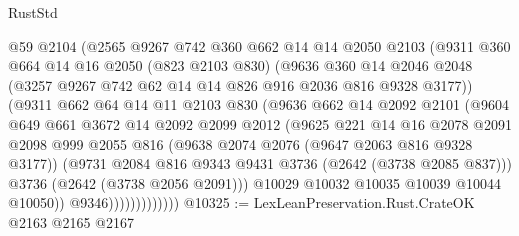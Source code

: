 \begin{lexlean}{RustStd}
\begin{coremodule}
                        @59
                        @2104
                        (@2565
                          @9267
                          @742
                          @360
                          @662
                          @14
                          @14
                          @2050
                          @2103
                          (@9311
                            @360
                            @664
                            @14
                            @16
                            @2050
                            (@823 @2103 @830)
                            (@9636
                              @360
                              @14
                              @2046
                              @2048
                              (@3257 @9267 @742 @62 @14 @14 @826 @916 @2036 @816 @9328 @3177))
                            (@9311
                              @662
                              @64
                              @14
                              @11
                              @2103
                              @830
                              (@9636
                                @662
                                @14
                                @2092
                                @2101
                                (@9604
                                  @649
                                  @661
                                  @3672
                                  @14
                                  @2092
                                  @2099
                                  @2012
                                  (@9625
                                    @221
                                    @14
                                    @16
                                    @2078
                                    @2091
                                    @2098
                                    @999
                                    @2055
                                    @816
                                    (@9638 @2074 @2076 (@9647 @2063 @816 @9328 @3177))
                                    (@9731 @2084 @816 @9343 @9431 @3736 (@2642 (@3738 @2085 @837)))
                                    @3736
                                    (@2642 (@3738 @2056 @2091)))
                                  @10029
                                  @10032
                                  @10035
                                  @10039
                                  @10044
                                  @10050))
                              @9346)))))))))))))
@10325 := LexLeanPreservation.Rust.CrateOK @2163 @2165 @2167

\end{coremodule}
\end{lexlean}
